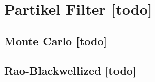 

\begin{comment}
------------------------------------------------------------------------------------------
\end{comment}
\section{Partikel Filter [todo]}

\begin{comment}
------------------------------------------------------------------------------------------
- \cite{kurth2003experimental}
	- Monte Carlo localization, or particle ltering, provides a method of representing multimodal distri-butions for position estimation [4, 12], with the ad-vantage that the computational requirements can be scaled. The main advantage of these methods is their ability to recover robustly from a poor initial condition.
- \cite{fox1999monte}
\end{comment}
\subsection{Monte Carlo [todo]}


\begin{comment}
------------------------------------------------------------------------------------------
Rao-Blackwellized Particle Filtering
https://people.eecs.berkeley.edu/~pabbeel/cs287-fa12/slides/RBPF.pdf

- \cite{murphy2001rao}
	- Rao-Blackwellised particle filtering for dynamic Bayesian networks
\end{comment}
\subsection{Rao-Blackwellized [todo]}


\begin{comment}
------------------------------------------------------------------------------------------
- \cite{kurth2003experimental}
	- We are currently developing a batch localization method, which considers all the data collected by the robot and nds the best path estimate given all the data. Although time consuming computationally, this will produce the theoretically optimal result obtainable from the collected data; we can then evaluate the results of our online localization method by comparing to this optimal solution.
\end{comment}


